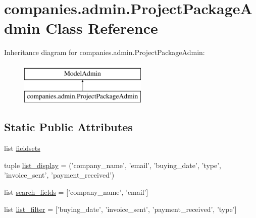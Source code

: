 \hypertarget{classcompanies_1_1admin_1_1_project_package_admin}{\section{companies.\-admin.\-Project\-Package\-Admin Class Reference}
\label{classcompanies_1_1admin_1_1_project_package_admin}
}
Inheritance diagram for companies.\-admin.\-Project\-Package\-Admin\-:\begin{figure}[H]
\begin{center}
\leavevmode
\includegraphics[height=2.000000cm]{classcompanies_1_1admin_1_1_project_package_admin}
\end{center}
\end{figure}
\subsection*{Static Public Attributes}
\begin{DoxyCompactItemize}
\item 
list \hyperlink{classcompanies_1_1admin_1_1_project_package_admin_affeb3f87ea2cccc9766aa6b340c93a7d}{fieldsets}
\item 
tuple \hyperlink{classcompanies_1_1admin_1_1_project_package_admin_a26501589dcd99524d1a65101f4c35940}{list\-\_\-display} = ('company\-\_\-name', 'email', 'buying\-\_\-date', 'type', 'invoice\-\_\-sent', 'payment\-\_\-received')
\item 
list \hyperlink{classcompanies_1_1admin_1_1_project_package_admin_a856ebcb90b8a6fece0fc5ad8dca4b557}{search\-\_\-fields} = \mbox{[}'company\-\_\-name', 'email'\mbox{]}
\item 
list \hyperlink{classcompanies_1_1admin_1_1_project_package_admin_a1c66536add091e10c5c0c00a658c99bc}{list\-\_\-filter} = \mbox{[}'buying\-\_\-date', 'invoice\-\_\-sent', 'payment\-\_\-received', 'type'\mbox{]}
\end{DoxyCompactItemize}


